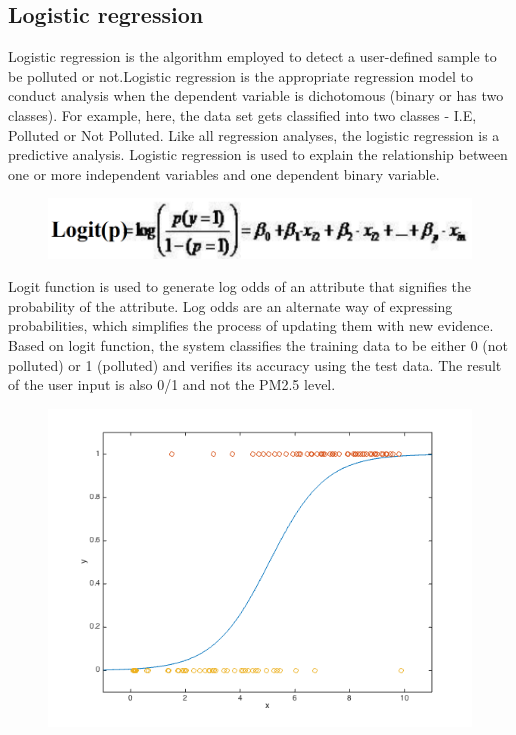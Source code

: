 \subsection{Logistic regression}
Logistic regression  is the algorithm employed to detect a user-defined sample to be polluted or not.Logistic regression is the appropriate regression model to conduct analysis when the dependent variable is dichotomous (binary or has two classes).
For example, here, the data set gets classified into two classes - I.E, Polluted or Not Polluted. Like all regression analyses, the logistic regression is a predictive analysis. Logistic regression is used to explain the relationship between one or more independent variables and one dependent binary variable.
\begin{figure}[h]
\label{ss}
\centering
\includegraphics[width= 14 cm]{log.png}
\end{figure}
Logit function is used to generate log odds of an attribute that signifies the probability of the attribute. Log odds are an alternate way of expressing probabilities, which simplifies the process of updating them with new evidence. Based on logit function, the system classifies the training data to be either 0 (not polluted) or 1 (polluted) and verifies its accuracy using the test data. The result of the user input is also 0/1 and not the PM2.5 level.
\begin{figure}[h]
\label{ss}
\centering
\includegraphics[width= 14 cm]{logorg.png}
\end{figure}
